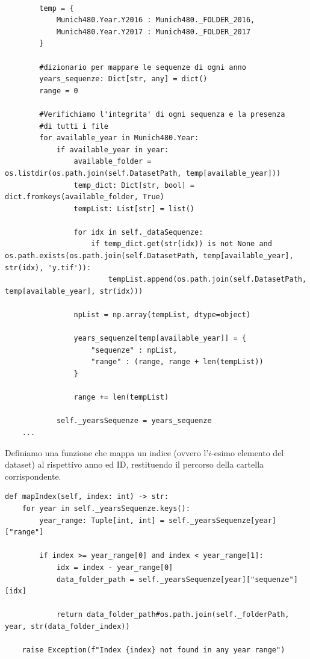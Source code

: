 \begin{lstlisting}
    
        temp = {
            Munich480.Year.Y2016 : Munich480._FOLDER_2016,
            Munich480.Year.Y2017 : Munich480._FOLDER_2017
        }
        
        #dizionario per mappare le sequenze di ogni anno
        years_sequenze: Dict[str, any] = dict()
        range = 0
        
        #Verifichiamo l'integrita' di ogni sequenza e la presenza 
        #di tutti i file
        for available_year in Munich480.Year:
            if available_year in year:
                available_folder = os.listdir(os.path.join(self.DatasetPath, temp[available_year]))
                temp_dict: Dict[str, bool] = dict.fromkeys(available_folder, True) 
                tempList: List[str] = list()

                for idx in self._dataSequenze:
                    if temp_dict.get(str(idx)) is not None and os.path.exists(os.path.join(self.DatasetPath, temp[available_year], str(idx), 'y.tif')):
                        tempList.append(os.path.join(self.DatasetPath, temp[available_year], str(idx)))
                
                npList = np.array(tempList, dtype=object)
                
                years_sequenze[temp[available_year]] = {
                    "sequenze" : npList,
                    "range" : (range, range + len(tempList))
                }
                
                range += len(tempList)

            self._yearsSequenze = years_sequenze
    ...
\end{lstlisting}

Definiamo una funzione che mappa un indice (ovvero l'$i$-esimo elemento del dataset) 
al rispettivo anno ed ID, restituendo il percorso della cartella corrispondente.
\begin{lstlisting}
def mapIndex(self, index: int) -> str:
    for year in self._yearsSequenze.keys():
        year_range: Tuple[int, int] = self._yearsSequenze[year]["range"]
        
        if index >= year_range[0] and index < year_range[1]:
            idx = index - year_range[0]
            data_folder_path = self._yearsSequenze[year]["sequenze"][idx]
            
            return data_folder_path#os.path.join(self._folderPath, year, str(data_folder_index))
            
    raise Exception(f"Index {index} not found in any year range")  
\end{lstlisting}

